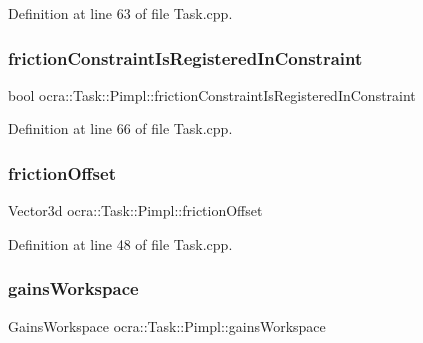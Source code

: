 Definition at line 63 of file Task.\+cpp.

\hypertarget{structocra_1_1Task_1_1Pimpl_aa23ba3a568d9e47f1a6157715a818285}{}\label{structocra_1_1Task_1_1Pimpl_aa23ba3a568d9e47f1a6157715a818285} 
\subsubsection{\texorpdfstring{friction\+Constraint\+Is\+Registered\+In\+Constraint}{frictionConstraintIsRegisteredInConstraint}}
{\footnotesize\ttfamily bool ocra\+::\+Task\+::\+Pimpl\+::friction\+Constraint\+Is\+Registered\+In\+Constraint}



Definition at line 66 of file Task.\+cpp.

\hypertarget{structocra_1_1Task_1_1Pimpl_aa11c5e2967e8355b4892155f5dd61a33}{}\label{structocra_1_1Task_1_1Pimpl_aa11c5e2967e8355b4892155f5dd61a33} 
\subsubsection{\texorpdfstring{friction\+Offset}{frictionOffset}}
{\footnotesize\ttfamily Vector3d ocra\+::\+Task\+::\+Pimpl\+::friction\+Offset}



Definition at line 48 of file Task.\+cpp.

\hypertarget{structocra_1_1Task_1_1Pimpl_ad21ff79351aaf0c65b020f654d9c5140}{}\label{structocra_1_1Task_1_1Pimpl_ad21ff79351aaf0c65b020f654d9c5140} 
\subsubsection{\texorpdfstring{gains\+Workspace}{gainsWorkspace}}
{\footnotesize\ttfamily Gains\+Workspace ocra\+::\+Task\+::\+Pimpl\+::gains\+Workspace}



